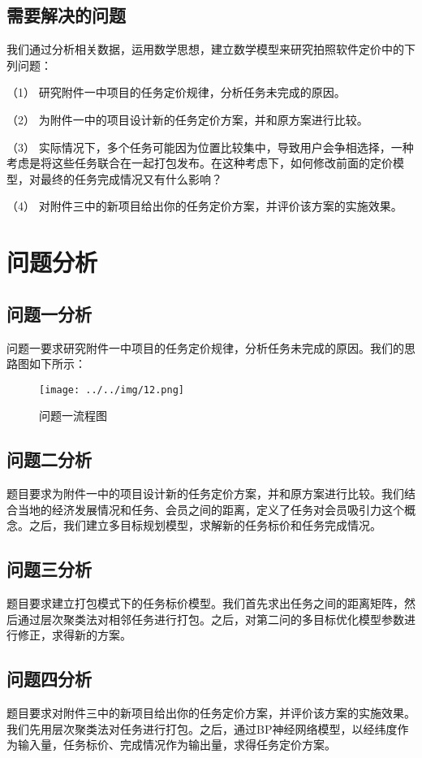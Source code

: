 \documentclass[withoutpreface,bwprint]{cumcmthesis} %
\begin{document}
\subsection{需要解决的问题}

我们通过分析相关数据，运用数学思想，建立数学模型来研究拍照软件定价中的下
列问题：

（1） 研究附件一中项目的任务定价规律，分析任务未完成的原因。

（2） 为附件一中的项目设计新的任务定价方案，并和原方案进行比较。

（3） 实际情况下，多个任务可能因为位置比较集中，导致用户会争相选择，一种考虑是将这些任务联合在一起打包发布。在这种考虑下，如何修改前面的定价模型，对最终的任务完成情况又有什么影响？

（4） 对附件三中的新项目给出你的任务定价方案，并评价该方案的实施效果。

\section{问题分析}

\subsection{问题一分析}

问题一要求研究附件一中项目的任务定价规律，分析任务未完成的原因。我们的思路图如下所示：

\begin{figure}[H]
	\centering
	\texttt{[image: ../../img/12.png]}
	\caption{问题一流程图}
\end{figure}

\subsection{问题二分析}
题目要求为附件一中的项目设计新的任务定价方案，并和原方案进行比较。我们结合当地的经济发展情况和任务、会员之间的距离，定义了任务对会员吸引力这个概念。之后，我们建立多目标规划模型，求解新的任务标价和任务完成情况。

\subsection{问题三分析}
题目要求建立打包模式下的任务标价模型。我们首先求出任务之间的距离矩阵，然后通过层次聚类法对相邻任务进行打包。之后，对第二问的多目标优化模型参数进行修正，求得新的方案。

\subsection{问题四分析}
题目要求对附件三中的新项目给出你的任务定价方案，并评价该方案的实施效果。我们先用层次聚类法对任务进行打包。之后，通过BP神经网络模型，以经纬度作为输入量，任务标价、完成情况作为输出量，求得任务定价方案。
\end{document}
